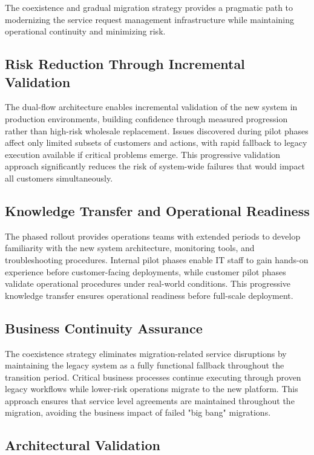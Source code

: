 The coexistence and gradual migration strategy provides a pragmatic path to modernizing the service request management infrastructure while maintaining operational continuity and minimizing risk.

\subsection{Risk Reduction Through Incremental Validation}

The dual-flow architecture enables incremental validation of the new system in production environments, building confidence through measured progression rather than high-risk wholesale replacement. Issues discovered during pilot phases affect only limited subsets of customers and actions, with rapid fallback to legacy execution available if critical problems emerge. This progressive validation approach significantly reduces the risk of system-wide failures that would impact all customers simultaneously.

\subsection{Knowledge Transfer and Operational Readiness}

The phased rollout provides operations teams with extended periods to develop familiarity with the new system architecture, monitoring tools, and troubleshooting procedures. Internal pilot phases enable IT staff to gain hands-on experience before customer-facing deployments, while customer pilot phases validate operational procedures under real-world conditions. This progressive knowledge transfer ensures operational readiness before full-scale deployment.

\subsection{Business Continuity Assurance}

The coexistence strategy eliminates migration-related service disruptions by maintaining the legacy system as a fully functional fallback throughout the transition period. Critical business processes continue executing through proven legacy workflows while lower-risk operations migrate to the new platform. This approach ensures that service level agreements are maintained throughout the migration, avoiding the business impact of failed "big bang" migrations.

\subsection{Architectural Validation}

